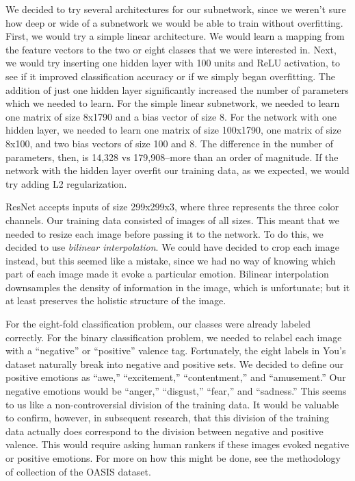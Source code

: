 \documentclass[10pt,twocolumn,letterpaper]{article}
\begin{document}
We decided to try several architectures for our subnetwork, since we weren't sure how deep or wide of a subnetwork we would be able to train without overfitting. First, we would try a simple linear architecture. We would learn a mapping from the feature vectors to the two or eight classes that we were interested in. Next, we would try inserting one hidden layer with 100 units and ReLU activation, to see if it improved classification accuracy or if we simply began overfitting. The addition of just one hidden layer significantly increased the number of parameters which we needed to learn. For the simple linear subnetwork, we needed to learn one matrix of size 8x1790 and a bias vector of size 8. For the network with one hidden layer, we needed to learn one matrix of size 100x1790, one matrix of size 8x100, and two bias vectors of size 100 and 8. The difference in the number of parameters, then, is 14,328 vs 179,908--more than an order of magnitude. If the network with the hidden layer overfit our training data, as we expected, we would try adding L2 regularization.

ResNet accepts inputs of size 299x299x3, where three represents the three color channels. Our training data consisted of images of all sizes. This meant that we needed to resize each image before passing it to the network. To do this, we decided to use \textit{bilinear interpolation}. We could have decided to crop each image instead, but this seemed like a mistake, since we had no way of knowing which part of each image made it evoke a particular emotion. Bilinear interpolation downsamples the density of information in the image, which is unfortunate; but it at least preserves the holistic structure of the image.

For the eight-fold classification problem, our classes were already labeled correctly. For the binary classification problem, we needed to relabel each image with a ``negative'' or ``positive'' valence tag. Fortunately, the eight labels in You's dataset naturally break into negative and positive sets. We decided to define our positive emotions as ``awe,'' ``excitement,'' ``contentment,'' and ``amusement.'' Our negative emotions would be ``anger,'' ``disgust,'' ``fear,'' and ``sadness.'' This seems to us like a non-controversial division of the training data. It would be valuable to confirm, however, in subsequent research, that this division of the training data actually does correspond to the division between negative and positive valence. This would require asking human rankers if these images evoked negative or positive emotions. For more on how this might be done, see the methodology of collection of the OASIS dataset\cite{oasis}.
\end{document}
